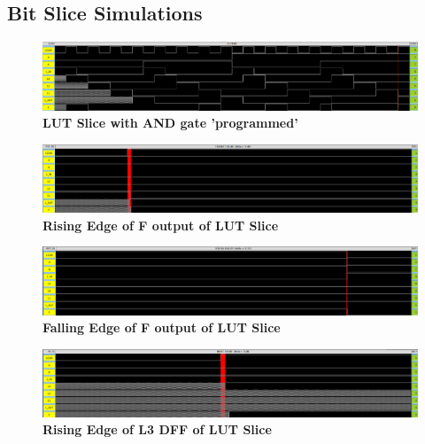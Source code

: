\documentclass[a4paper]{article}
\begin{document}
\subsection{\textbf{Bit Slice Simulations}}
    \begin{figure}[H]
        \centering
        \includegraphics[width=\textwidth,height=\textheight,keepaspectratio]{../../irsim/pics/lut_and_ab.png}
        \caption{\textbf{LUT Slice with AND gate 'programmed'}}
        \label{fig:gg}
    \end{figure}
    \begin{figure}[H]
        \centering
        \includegraphics[width=\textwidth,height=\textheight,keepaspectratio]{../../irsim/pics/lut_f_rising.png}
        \caption{\textbf{Rising Edge of F output of LUT Slice}}
        \label{fig:gg}
    \end{figure}
    \begin{figure}[H]
        \centering
        \includegraphics[width=\textwidth,height=\textheight,keepaspectratio]{../../irsim/pics/lut_f_falling.png}
        \caption{\textbf{Falling Edge of F output of LUT Slice}}
        \label{fig:gg}
    \end{figure}
    \begin{figure}[H]
        \centering
        \includegraphics[width=\textwidth,height=\textheight,keepaspectratio]{../../irsim/pics/lut_l3_rising.png}
        \caption{\textbf{Rising Edge of L3 DFF of LUT Slice}}
        \label{fig:gg}
    \end{figure}
\end{document}
